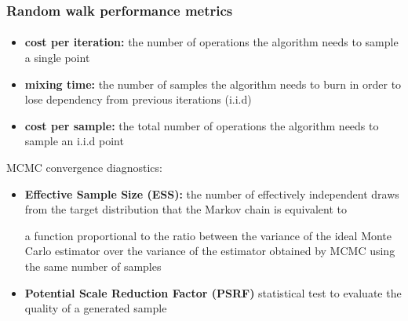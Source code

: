 \documentclass{beamer}
\begin{document}
   \begin{frame}
      \frametitle{Random walk performance metrics}
      \framesubtitle{}
      
      \begin{itemize}
         \item \textbf{cost per iteration:} the number of operations the algorithm needs to sample a single point
         \item \textbf{mixing time:} the number of samples the algorithm needs to burn in order to lose dependency from previous iterations (i.i.d)
         \item \textbf{cost per sample:} the total number of operations the algorithm needs to sample an i.i.d point

      \end{itemize}

      MCMC convergence diagnostics:

      \begin{itemize}
         \item \textbf{Effective Sample Size (ESS): } the number of effectively independent draws from
         the target distribution that the Markov chain is equivalent to

         \tiny a function proportional to the ratio between the
         \tiny variance of the ideal Monte Carlo estimator %
         \tiny over the variance of the estimator obtained
         \tiny by MCMC %
         \tiny using the same number of samples %

         \item  \footnotesize \textbf{Potential Scale Reduction Factor (PSRF)}
         statistical test to evaluate the quality of a generated sample
         
      \end{itemize}
   
   \end{frame}
\end{document}
